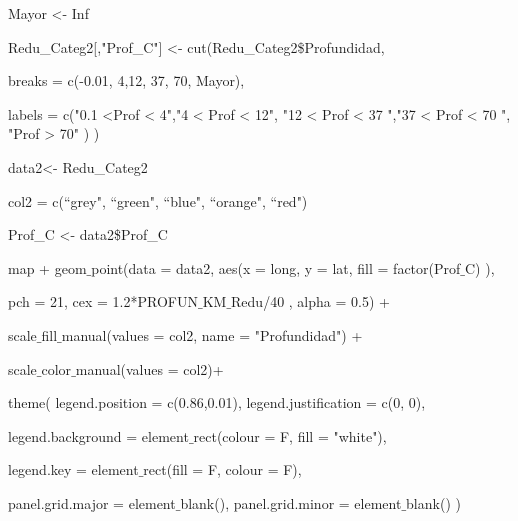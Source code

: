 \documentclass[12pt]{report}
\begin{document}
{{{{{{{{{{{{{{			  Mayor <- Inf
			  
			  Redu\_Categ2[,"Prof\_C"] <- cut(Redu\_Categ2\$Profundidad,
			  
			   breaks = c(-0.01, 4,12,  37, 70, Mayor),
			   
			   labels = c("0.1 <Prof < 4","4 < Prof < 12",  "12 < Prof < 37 ","37 < Prof < 70 ", "Prof > 70" ) )
			 
			  data2<- Redu\_Categ2
			  
			  col2 = c(“grey", “green", “blue", “orange", “red")
			  
			 
			  Prof\_C <- data2\$Prof\_C    }}
			  
			  
			  
			  
			  
			  
			  
			    { \scriptsize  { \ttfamily  		
			    
			    
			    map + geom$\_$point(data = data2,  aes(x = long, y = lat, fill = factor(Prof$\_$C) ),
			    
			     pch = 21,  cex  = 1.2*PROFUN$\_$KM$\_$Redu/40 ,  alpha = 0.5) +
			     
			    scale$\_$fill$\_$manual(values = col2, name = "Profundidad") +
			    
			     scale$\_$color$\_$manual(values = col2)+
			    
			    theme( legend.position = c(0.86,0.01),  legend.justification = c(0, 0),
			    
			    legend.background = element$\_$rect(colour = F, fill = "white"),
			    
			    legend.key = element$\_$rect(fill = F, colour = F),    \vspace{-0,15 cm} 
			    
			    panel.grid.major = element$\_$blank(), panel.grid.minor = element$\_$blank() )    }}  \\
			     
			     
			
		 
				
			                      
			            
			            
}}}}}}}}}}}}
\end{document}
